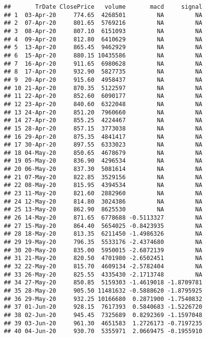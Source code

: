 \documentclass[
]{article}
\begin{document}
\begin{verbatim}
##       TrDate ClosePrice   volume       macd     signal
## 1  03-Apr-20     774.65  4268501         NA         NA
## 2  07-Apr-20     801.65  5769216         NA         NA
## 3  08-Apr-20     807.10  6151093         NA         NA
## 4  09-Apr-20     812.80  6410629         NA         NA
## 5  13-Apr-20     865.45  9462929         NA         NA
## 6  15-Apr-20     880.15 10435586         NA         NA
## 7  16-Apr-20     911.65  6980628         NA         NA
## 8  17-Apr-20     932.90  5827735         NA         NA
## 9  20-Apr-20     915.60  4958437         NA         NA
## 10 21-Apr-20     870.35  5122597         NA         NA
## 11 22-Apr-20     852.60  6090177         NA         NA
## 12 23-Apr-20     840.60  6322048         NA         NA
## 13 24-Apr-20     851.20  7960660         NA         NA
## 14 27-Apr-20     855.25  4224467         NA         NA
## 15 28-Apr-20     857.15  3773038         NA         NA
## 16 29-Apr-20     875.35  4841417         NA         NA
## 17 30-Apr-20     897.55  6333023         NA         NA
## 18 04-May-20     850.65  4678679         NA         NA
## 19 05-May-20     836.90  4296534         NA         NA
## 20 06-May-20     837.30  5081614         NA         NA
## 21 07-May-20     822.85  3529156         NA         NA
## 22 08-May-20     815.95  4394534         NA         NA
## 23 11-May-20     821.60  2882960         NA         NA
## 24 12-May-20     814.80  3024386         NA         NA
## 25 13-May-20     862.90  8625530         NA         NA
## 26 14-May-20     871.65  6778688 -0.5113327         NA
## 27 15-May-20     864.40  5654025 -0.8423935         NA
## 28 18-May-20     813.35  6211450 -1.4986326         NA
## 29 19-May-20     796.35  5533176 -2.4374680         NA
## 30 20-May-20     835.00  5950015 -2.6872139         NA
## 31 21-May-20     820.50  4701980 -2.6502451         NA
## 32 22-May-20     815.70  4609134 -2.5782404         NA
## 33 26-May-20     825.55  4335430 -2.1713748         NA
## 34 27-May-20     850.85  5159303 -1.4619018 -1.8709781
## 35 28-May-20     905.50 11481632 -0.5888620 -1.8795925
## 36 29-May-20     932.25 10166680  0.2871900 -1.7540832
## 37 01-Jun-20     928.15  7617393  0.5840683 -1.5226720
## 38 02-Jun-20     945.45  7325689  0.8292369 -1.1597048
## 39 03-Jun-20     961.30  4651583  1.2726173 -0.7197235
## 40 04-Jun-20     930.70  5355971  2.0669475 -0.1955910
\end{verbatim}
\end{document}
